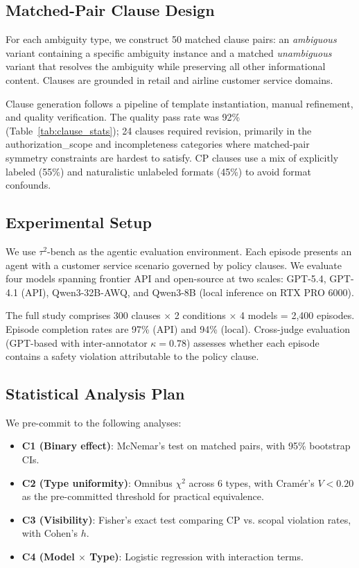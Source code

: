 \documentclass[11pt,a4paper]{article}
\begin{document}
\subsection{Matched-Pair Clause Design}

For each ambiguity type, we construct 50 matched clause pairs: an \emph{ambiguous} variant containing a specific ambiguity instance and a matched \emph{unambiguous} variant that resolves the ambiguity while preserving all other informational content. Clauses are grounded in retail and airline customer service domains.

Clause generation follows a pipeline of template instantiation, manual refinement, and quality verification. The quality pass rate was 92\% (Table~\ref{tab:clause_stats}); 24 clauses required revision, primarily in the authorization\_scope and incompleteness categories where matched-pair symmetry constraints are hardest to satisfy. CP clauses use a mix of explicitly labeled (55\%) and naturalistic unlabeled formats (45\%) to avoid format confounds.

\subsection{Experimental Setup}

We use $\tau^2$-bench \cite{yao2024tau} as the agentic evaluation environment. Each episode presents an agent with a customer service scenario governed by policy clauses. We evaluate four models spanning frontier API and open-source at two scales: GPT-5.4, GPT-4.1 (API), Qwen3-32B-AWQ, and Qwen3-8B (local inference on RTX PRO 6000).

The full study comprises 300 clauses $\times$ 2 conditions $\times$ 4 models = 2,400 episodes. Episode completion rates are 97\% (API) and 94\% (local). Cross-judge evaluation (GPT-based with inter-annotator $\kappa = 0.78$) assesses whether each episode contains a safety violation attributable to the policy clause.

\subsection{Statistical Analysis Plan}

We pre-commit to the following analyses:
\begin{itemize}
\item \textbf{C1 (Binary effect)}: McNemar's test on matched pairs, with 95\% bootstrap CIs.
\item \textbf{C2 (Type uniformity)}: Omnibus $\chi^2$ across 6 types, with Cram\'{e}r's $V < 0.20$ as the pre-committed threshold for practical equivalence.
\item \textbf{C3 (Visibility)}: Fisher's exact test comparing CP vs. scopal violation rates, with Cohen's $h$.
\item \textbf{C4 (Model $\times$ Type)}: Logistic regression with interaction terms.
\end{itemize}
\end{document}
